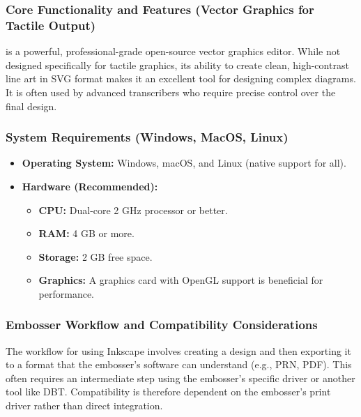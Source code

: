\subsubsection{Core Functionality and Features (Vector Graphics for Tactile Output)}\label{ch14:sssec:inkscape-features}
 is a powerful, professional-grade open-source vector graphics editor. While not designed specifically for tactile graphics, its ability to create clean, high-contrast line art in SVG format makes it an excellent tool for designing complex diagrams. It is often used by advanced transcribers who require precise control over the final design.

\subsubsection{System Requirements (Windows, MacOS, Linux)}\label{ch14:sssec:inkscape-sysreq}
\begin{itemize}
	\item \textbf{Operating System:} Windows, macOS, and Linux (native support for all).
	\item \textbf{Hardware (Recommended):}
	      \begin{itemize}
		      \item \textbf{CPU:} Dual-core 2 GHz processor or better.
		      \item \textbf{RAM:} 4 GB or more.
		      \item \textbf{Storage:} 2 GB free space.
		      \item \textbf{Graphics:} A graphics card with OpenGL support is beneficial for performance.
	      \end{itemize}
\end{itemize}

\subsubsection{Embosser Workflow and Compatibility Considerations}\label{ch14:sssec:inkscape-compat}
The workflow for using Inkscape involves creating a design and then exporting it to a format that the embosser's software can understand (e.g., PRN, PDF). This often requires an intermediate step using the embosser's specific driver or another tool like DBT. Compatibility is therefore dependent on the embosser's print driver rather than direct integration.

